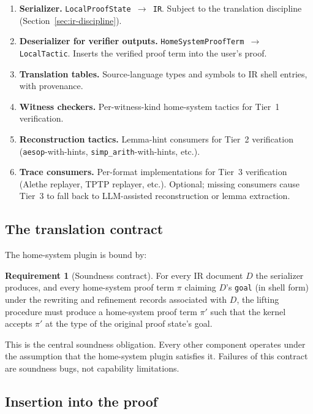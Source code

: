 \documentclass[11pt,letterpaper]{article}
\theoremstyle{definition}
\newtheorem{requirement}{Requirement}[section]
\theoremstyle{remark}
\begin{document}
\begin{enumerate}[leftmargin=2em]
  \item \textbf{Serializer.} \texttt{LocalProofState $\to$ IR}. Subject
        to the translation discipline (Section~\ref{sec:ir-discipline}).
  \item \textbf{Deserializer for verifier outputs.}
        \texttt{HomeSystemProofTerm $\to$ LocalTactic}. Inserts the
        verified proof term into the user's proof.
  \item \textbf{Translation tables.} Source-language types and symbols
        to IR shell entries, with provenance.
  \item \textbf{Witness checkers.} Per-witness-kind home-system tactics
        for Tier~1 verification.
  \item \textbf{Reconstruction tactics.} Lemma-hint consumers for
        Tier~2 verification (\texttt{aesop}-with-hints,
        \texttt{simp\_arith}-with-hints, etc.).
  \item \textbf{Trace consumers.} Per-format implementations for
        Tier~3 verification (Alethe replayer, TPTP replayer, etc.).
        Optional; missing consumers cause Tier~3 to fall back to
        LLM-assisted reconstruction or lemma extraction.
\end{enumerate}

\subsection{The translation contract}

The home-system plugin is bound by:

\begin{requirement}[Soundness contract]
For every IR document $D$ the serializer produces, and every
home-system proof term $\pi$ claiming $D$'s \texttt{goal} (in
shell form) under the rewriting and refinement records associated
with $D$, the lifting procedure must produce a home-system proof term
$\pi'$ such that the kernel accepts $\pi'$ at the type of the original
proof state's goal.
\end{requirement}

This is the central soundness obligation. Every other component
operates under the assumption that the home-system plugin satisfies
it. Failures of this contract are soundness bugs, not capability
limitations.

\subsection{Insertion into the proof}
\end{document}
